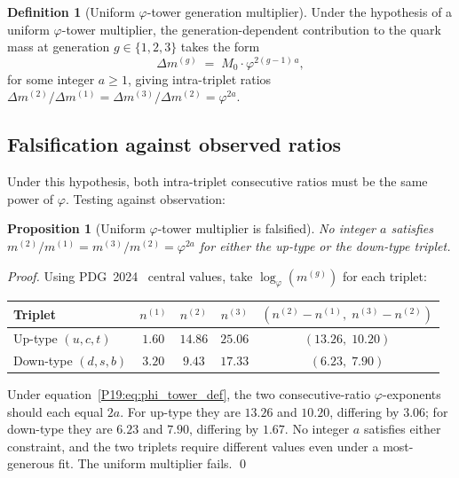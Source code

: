 \documentclass[11pt,a4paper]{article}
\newtheorem{proposition}[theorem]{Proposition}
\theoremstyle{definition}\newtheorem{definition}[theorem]{Definition}
\theoremstyle{remark}
\newcommand{\vp}{\varphi}
\begin{document}
\begin{definition}[Uniform $\vp$-tower generation multiplier]
\label{P19:def:phi_tower}
Under the hypothesis of a uniform $\vp$-tower multiplier, the
generation-dependent contribution to the quark mass at generation
$g\in\{1,2,3\}$ takes the form
\begin{equation}
  \Delta m^{(g)} \;=\; M_0 \cdot \vp^{2(g-1)\,a},
  \label{P19:eq:phi_tower_def}
\end{equation}
for some integer $a\geq 1$, giving intra-triplet ratios
$\Delta m^{(2)}/\Delta m^{(1)} = \Delta m^{(3)}/\Delta m^{(2)}
= \vp^{2a}$.
\end{definition}

\subsection{Falsification against observed ratios}

Under this hypothesis, both intra-triplet consecutive ratios must
be the same power of $\vp$.  Testing against observation:

\begin{proposition}[Uniform $\vp$-tower multiplier is falsified]
\label{P19:prop:phi_tower_falsified}
No integer $a$ satisfies
$m^{(2)}/m^{(1)}=m^{(3)}/m^{(2)}=\vp^{2a}$ for either the up-type or
the down-type triplet.
\end{proposition}

\begin{proof}
Using PDG~2024~\cite{PDG2024} central values, take
$\log_\vp(m^{(g)})$ for each triplet:
\begin{center}
\begin{tabular}{lcccc}
\toprule
Triplet & $n^{(1)}$ & $n^{(2)}$ & $n^{(3)}$ &
$(n^{(2)}-n^{(1)},\;n^{(3)}-n^{(2)})$ \\
\midrule
Up-type $(u,c,t)$   & $1.60$ & $14.86$ & $25.06$ & $(13.26,\;10.20)$ \\
Down-type $(d,s,b)$ & $3.20$ & $9.43$  & $17.33$ & $(6.23,\;7.90)$ \\
\bottomrule
\end{tabular}
\end{center}
Under equation~\eqref{P19:eq:phi_tower_def}, the two consecutive-ratio
$\vp$-exponents should each equal $2a$.  For up-type they are
$13.26$ and $10.20$, differing by $3.06$; for down-type they are
$6.23$ and $7.90$, differing by $1.67$.  No integer $a$ satisfies
either constraint, and the two triplets require different values
even under a most-generous fit.  The uniform multiplier fails.
\qed
\end{proof}
\end{document}
